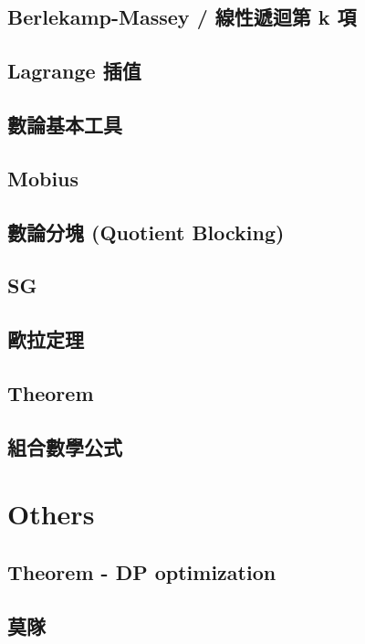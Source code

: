 \subsection{Berlekamp-Massey / 線性遞迴第 k 項}

\subsection{Lagrange 插值}

\subsection{數論基本工具}

\subsection{Mobius}

\subsection{數論分塊 (Quotient Blocking)}

\subsection{SG}

\subsection{歐拉定理}

\subsection{Theorem}

\subsection{組合數學公式}


\section{Others}

\subsection{Theorem - DP optimization}

\subsection{莫隊}

